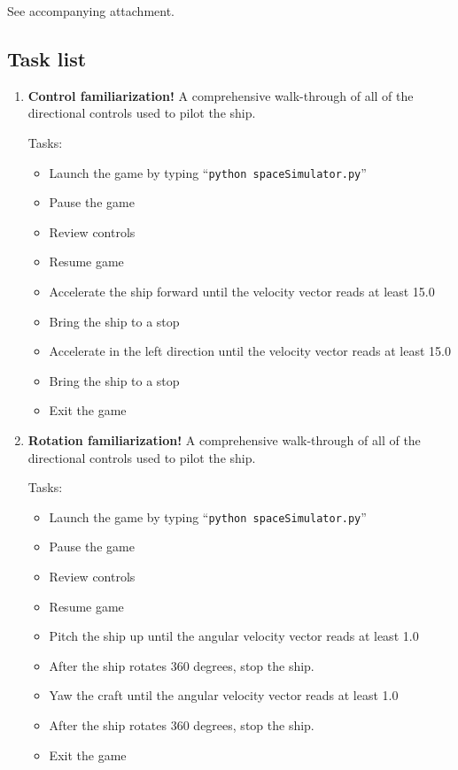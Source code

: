 See accompanying attachment.

\subsection{Task list}

\begin{enumerate}

  \item \textbf{Control familiarization!}  A comprehensive walk-through of all of the directional controls used to pilot the ship. 

  Tasks:
  \begin{itemize}
    \item Launch the game by typing ``\texttt{python spaceSimulator.py}''
    \item Pause the game
    \item Review controls
    \item Resume game
    \item Accelerate the ship forward until the velocity vector reads at least 15.0
    \item Bring the ship to a stop
    \item Accelerate in the left direction until the velocity vector reads at least 15.0
    \item Bring the ship to a stop
    \item Exit the game
  \end{itemize}
  
  \item \textbf{Rotation  familiarization!}  A comprehensive walk-through of all of the directional controls used to pilot the ship. 

  Tasks:
  \begin{itemize}
    \item Launch the game by typing ``\texttt{python spaceSimulator.py}''
    \item Pause the game
    \item Review controls
    \item Resume game
    \item Pitch the ship up until the angular velocity vector reads at least 1.0
    \item After the ship rotates 360 degrees, stop the ship.
    \item Yaw the craft until the angular velocity vector reads at least 1.0
    \item After the ship rotates 360 degrees, stop the ship.
    \item Exit the game
  \end{itemize}
  

\end{enumerate}
